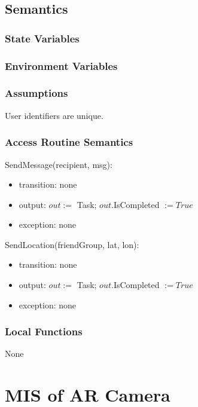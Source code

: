 \documentclass[12pt, titlepage]{article}
\begin{document}
\subsection{Semantics}

\subsubsection{State Variables}

\subsubsection{Environment Variables}

\subsubsection{Assumptions}

User identifiers are unique.

\subsubsection{Access Routine Semantics}

\noindent SendMessage(recipient, msg):
\begin{itemize}
\item transition: none
\item output: $out :=$ Task; $out$.IsCompleted $:= True$
\item exception: none
\end{itemize}

\noindent SendLocation(friendGroup, lat, lon):
\begin{itemize}
\item transition: none
\item output: $out :=$ Task; $out$.IsCompleted $:= True$
\item exception: none
\end{itemize}

\subsubsection{Local Functions}

None

\newpage

\section{MIS of AR Camera} \label{mARCamera}
\end{document}
